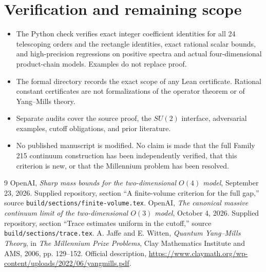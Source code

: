 \documentclass[11pt]{article}
\theoremstyle{definition}
\theoremstyle{remark}
\begin{document}
\section{Verification and remaining scope}
\begin{itemize}
\item The Python check verifies exact integer coefficient identities for
all 24 telescoping orders and the rectangle identities, exact rational
scalar bounds, and high-precision regressions on positive spectra and
actual four-dimensional product-chain models. Examples do not replace proof.
\item The formal directory records the exact scope of any Lean certificate.
Rational constant certificates are not formalizations of the operator
theorem or of Yang--Mills theory.
\item Separate audits cover the source proof, the $SU(2)$ interface,
adversarial examples, cutoff obligations, and prior literature.
\item No published manuscript is modified. No claim is made that the full
Family 215 continuum construction has been independently verified, that
this criterion is new, or that the Millennium problem has been resolved.
\end{itemize}

\begin{thebibliography}{9}
OpenAI, \emph{Sharp mass bounds for the two-dimensional $O(4)$ model},
September 23, 2026. Supplied repository, section ``A finite-volume
criterion for the full gap,'' source \texttt{build/sections/finite-volume.tex}.
OpenAI, \emph{The canonical massive continuum limit of the two-dimensional
$O(3)$ model}, October 4, 2026. Supplied repository, section ``Trace
estimates uniform in the cutoff,'' source \texttt{build/sections/trace.tex}.
A. Jaffe and E. Witten, \emph{Quantum Yang--Mills Theory}, in
\emph{The Millennium Prize Problems}, Clay Mathematics Institute and AMS,
2006, pp. 129--152. Official description,
\url{https://www.claymath.org/wp-content/uploads/2022/06/yangmills.pdf}.
\end{thebibliography}
\end{document}
